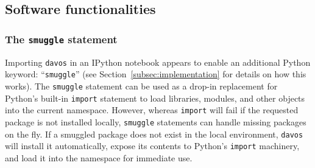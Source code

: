 \documentclass[preprint,12pt,a4paper]{elsarticle}
\begin{document}
\subsection{Software functionalities}
\subsubsection{The \texttt{smuggle} statement}\label{subsec:smuggle}
Importing \texttt{davos} in an IPython notebook appears to enable an additional Python keyword: ``\texttt{smuggle}'' (see Section~\ref{subsec:implementation} for details on how this works).
The \texttt{smuggle} statement can be used as a drop-in replacement for Python's built-in \texttt{import} statement to load libraries, modules, and other objects into the current namespace.
However, whereas \texttt{import} will fail if the requested package is not installed locally, \texttt{smuggle} statements can handle missing packages on the fly.
If a smuggled package does not exist in the local environment, \texttt{davos} will install it automatically, expose its contents to Python's \texttt{import} machinery, and load it into the namespace for immediate use.
\end{document}
